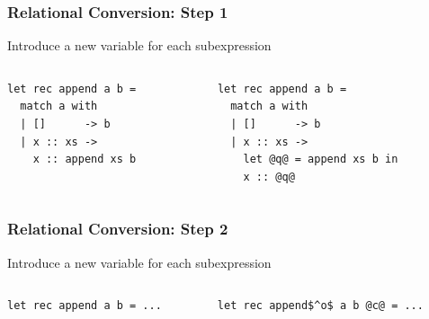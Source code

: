 \documentclass[xcolor=table]{beamer}
\begin{document}
\begin{frame}[fragile]
  \transwipe[direction=90]
  \frametitle{Relational Conversion: Step 1}
  
Introduce a new variable for each subexpression

\begin{columns}
\begin{column}{0.5\textwidth}
\begin{lstlisting}
let rec append a b =
  match a with
  | []      -> b
  | x :: xs -> 
    x :: append xs b
\end{lstlisting}
\end{column}
\begin{column}{0.5\textwidth}  
\begin{lstlisting}
let rec append a b =
  match a with 
  | []      -> b
  | x :: xs -> 
    let @q@ = append xs b in
    x :: @q@
\end{lstlisting}
\end{column}
\end{columns}
\end{frame}


\begin{frame}[fragile]
  \transwipe[direction=90]
  \frametitle{Relational Conversion: Step 2}
  
Introduce a new variable for each subexpression

\begin{columns}
\begin{column}{0.5\textwidth}
\begin{lstlisting}
let rec append a b = ...
\end{lstlisting}
\end{column}
\begin{column}{0.5\textwidth}  
\begin{lstlisting}
let rec append$^o$ a b @c@ = ...
\end{lstlisting}
\end{column}
\end{columns}  
\end{frame}
\end{document}
